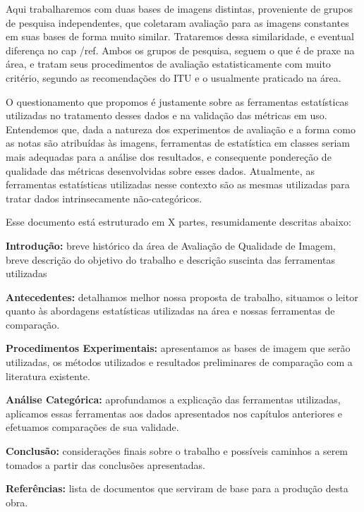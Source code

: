 	Aqui trabalharemos com duas bases de imagens distintas, proveniente de grupos de pesquisa independentes, que coletaram avaliação para as imagens constantes em suas bases de forma muito similar. Trataremos dessa similaridade, e eventual diferença no cap /ref{}. Ambos os grupos de pesquisa, seguem o que é de praxe na área, e tratam seus procedimentos de avaliação estatisticamente com muito critério, segundo as recomendações do ITU e o usualmente praticado na área.

	O questionamento que propomos é justamente sobre as ferramentas estatísticas utilizadas no tratamento desses dados e na validação das métricas em uso. Entendemos que, dada a natureza dos experimentos de avaliação e a forma como as notas são atribuídas às imagens, ferramentas de estatística em classes seriam mais adequadas para a análise dos resultados, e consequente pondereção de qualidade das métricas desenvolvidas sobre esses dados. Atualmente, as ferramentas estatísticas utilizadas nesse contexto são as mesmas utilizadas para tratar dados intrinsecamente não-categóricos.

	

	Esse documento está estruturado em X partes, resumidamente descritas abaixo:

\begin{description}
\item{\textbf{Introdução:} } breve histórico da área de Avaliação de Qualidade de Imagem, breve descrição do objetivo do trabalho e descrição suscinta das ferramentas utilizadas
\item{\textbf{Antecedentes:} } detalhamos melhor nossa proposta de trabalho, situamos o leitor quanto às abordagens estatísticas utilizadas na área e nossas ferramentas de comparação.
\item{\textbf{Procedimentos Experimentais:} } apresentamos as bases de imagem que serão utilizadas, os métodos utilizados e resultados preliminares de comparação com a literatura existente.
\item{\textbf{Análise Categórica:} } aprofundamos a explicação das ferramentas utilizadas, aplicamos essas ferramentas aos dados apresentados nos capítulos anteriores e efetuamos comparações de sua validade.
\item{\textbf{Conclusão:} } considerações finais sobre o trabalho e possíveis caminhos a serem tomados a partir das conclusões apresentadas.
\item{\textbf{Referências:} } lista de documentos que serviram de base para a produção desta obra.
\end{description}
